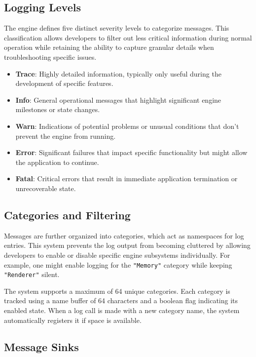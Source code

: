 \subsection{Logging Levels}

The engine defines five distinct severity levels to categorize messages. This classification allows developers to filter out less critical information during normal operation while retaining the ability to capture granular details when troubleshooting specific issues.

\begin{itemize}
    \item \textbf{Trace}: Highly detailed information, typically only useful during the development of specific features.
    \item \textbf{Info}: General operational messages that highlight significant engine milestones or state changes.
    \item \textbf{Warn}: Indications of potential problems or unusual conditions that don't prevent the engine from running.
    \item \textbf{Error}: Significant failures that impact specific functionality but might allow the application to continue.
    \item \textbf{Fatal}: Critical errors that result in immediate application termination or unrecoverable state.
\end{itemize}

\subsection{Categories and Filtering}

Messages are further organized into categories, which act as namespaces for log entries. This system prevents the log output from becoming cluttered by allowing developers to enable or disable specific engine subsystems individually. For example, one might enable logging for the \texttt{"Memory"} category while keeping \texttt{"Renderer"} silent.

The system supports a maximum of 64 unique categories. Each category is tracked using a name buffer of 64 characters and a boolean flag indicating its enabled state. When a log call is made with a new category name, the system automatically registers it if space is available.

\subsection{Message Sinks}

